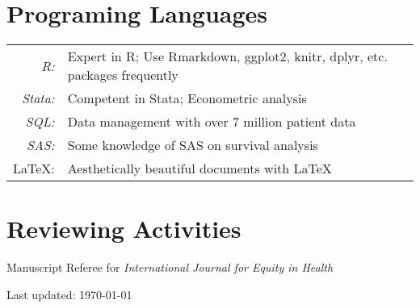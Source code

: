 \documentclass[a4paper,10pt]{article}
\begin{document}
\section{Programing Languages}
\begin{tabular}{rl} 
	\textit{R:} & Expert in R; Use Rmarkdown, ggplot2, knitr, dplyr, etc. packages frequently\\
	\textit{Stata:} & Competent in Stata; Econometric analysis \\
	\textit{SQL:} & Data management with over 7 million patient data\\
	\textit{SAS:} & Some knowledge of SAS on survival analysis\\
	{\LaTeX}: & Aesthetically beautiful documents with \LaTeX
\end{tabular}


\section{Reviewing Activities}
Manuscript Referee for \emph{International Journal for Equity in Health}\\




\vfill{}
\begin{center}
{\scriptsize  Last updated: \today\- }
\end{center}
\end{document}
